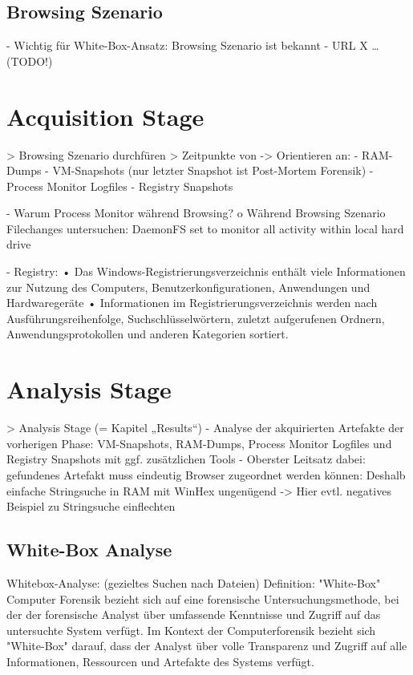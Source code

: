 \subsection{Browsing Szenario}
- Wichtig für White-Box-Ansatz: Browsing Szenario ist bekannt
- URL X … 	(TODO!)



\section{Acquisition Stage}

> Browsing Szenario durchfüren
> Zeitpunkte von -> Orientieren an: \cite{Muir.2019}
	- RAM-Dumps 
	- VM-Snapshots (nur letzter Snapshot ist Post-Mortem Forensik)
	- Process Monitor Logfiles
	- Registry Snapshots	

- Warum Process Monitor während Browsing?
	o Während Browsing Szenario Filechanges untersuchen: DaemonFS set to monitor all activity within local hard drive\cite{Ohana.2013}
	
- Registry: \cite{Rochmadi.2017}
	•	Das Windows-Registrierungsverzeichnis enthält viele Informationen zur Nutzung des Computers, Benutzerkonfigurationen, Anwendungen und Hardwaregeräte
	•	Informationen im Registrierungsverzeichnis werden nach Ausführungsreihenfolge, Suchschlüsselwörtern, zuletzt aufgerufenen Ordnern, Anwendungsprotokollen und anderen Kategorien sortiert.
	
	

\section{Analysis Stage}

> Analysis Stage (= Kapitel „Results“)
- Analyse der akquirierten Artefakte der vorherigen Phase: VM-Snapshots, RAM-Dumps, Process Monitor Logfiles und Registry Snapshots mit ggf. zusätzlichen Tools
- Oberster Leitsatz dabei: gefundenes Artefakt muss eindeutig Browser zugeordnet werden können: Deshalb einfache Stringsuche in RAM mit WinHex ungenügend -> Hier evtl. negatives Beispiel zu Stringsuche einflechten

\subsection{White-Box Analyse}

Whitebox-Analyse: (gezieltes Suchen nach Dateien) \cite{Bonetti.2014}
	Definition: "White-Box" Computer Forensik bezieht sich auf eine forensische Untersuchungsmethode, bei der der forensische Analyst über umfassende Kenntnisse und Zugriff auf das untersuchte System verfügt. Im Kontext der Computerforensik bezieht sich "White-Box" darauf, dass der Analyst über volle Transparenz und Zugriff auf alle Informationen, Ressourcen und Artefakte des Systems verfügt.
	

